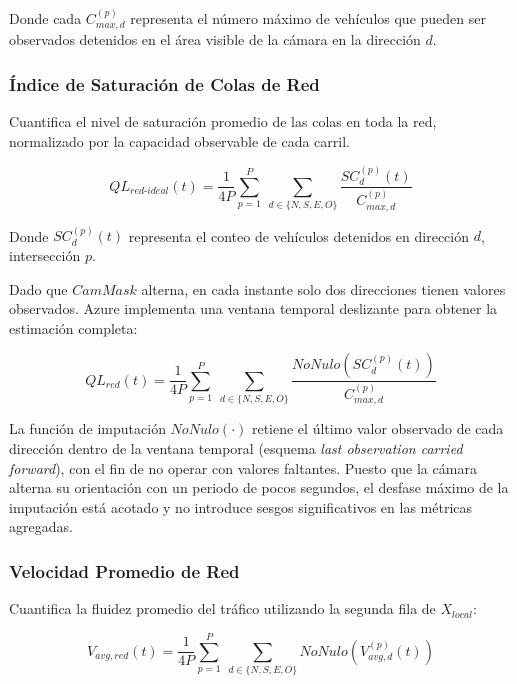 \documentclass[12pt,a4paper,oneside]{report}
\begin{document}
Donde cada \(C_{max,d}^{(p)}\) representa el número máximo de vehículos que pueden ser observados detenidos en el área visible de la cámara en la dirección \(d\).

\subsubsection{Índice de Saturación de Colas de Red}

Cuantifica el nivel de saturación promedio de las colas en toda la red, normalizado por la capacidad observable de cada carril.

\begin{equation}
QL_{red\text{-}ideal}(t) = \frac{1}{4P}\sum_{p = 1}^{P}\ \sum_{d \in \{N, S, E, O\}}\frac{SC_{d}^{(p)}(t)}{C_{max,d}^{(p)}}
\label{eq:qlideal}
\end{equation}

Donde \(SC_{d}^{(p)}(t)\) representa el conteo de vehículos detenidos en dirección \(d\), intersección \(p\).

Dado que \(CamMask\) alterna, en cada instante solo dos direcciones tienen valores observados. Azure implementa una ventana temporal deslizante para obtener la estimación completa:

\begin{equation}
QL_{red}(t) = \frac{1}{4P}\sum_{p = 1}^{P}\ \sum_{d \in \{N, S, E, O\}}\frac{NoNulo\!\left(SC_{d}^{(p)}(t)\right)}{C_{max,d}^{(p)}}
\label{eq:qlred}
\end{equation}

La función de imputación \(NoNulo(\cdot)\) retiene el último valor observado de cada dirección dentro de la ventana temporal (esquema \emph{last observation carried forward}), con el fin de no operar con valores faltantes. Puesto que la cámara alterna su orientación con un periodo de pocos segundos, el desfase máximo de la imputación está acotado y no introduce sesgos significativos en las métricas agregadas.

\subsubsection{Velocidad Promedio de Red}

Cuantifica la fluidez promedio del tráfico utilizando la segunda fila de \(X_{local}\):

\begin{equation}
V_{avg,red}(t) = \frac{1}{4P}\sum_{p = 1}^{P}\ \sum_{d \in \{N, S, E, O\}} NoNulo\!\left(V_{avg,d}^{(p)}(t)\right)
\label{eq:vavgred}
\end{equation}
\end{document}
